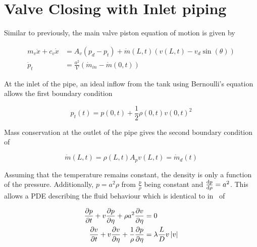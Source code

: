 \section{Valve Closing with Inlet piping}

Similar to previously, the main valve piston equation of motion is given by

\begin{equation*}
\begin{split}
    m_v \ddot{x} + c_v \dot{x} &= A_v \left( p_d - p_t \right) + \dot{m}(L,t) \left( v(L,t) - v_d \sin(\theta) \right) \\
    \dot{p}_t &= \frac{a^2}{V} \left( \dot{m}_{in} - \dot{m}(0,t) \right)
\end{split}
\end{equation*}

At the inlet of the pipe, an ideal inflow from the tank using Bernoulli's equation allows the first boundary condition

\begin{equation*}
    p_t(t) = p(0,t) + \frac{1}{2} \rho(0,t) v(0,t)^2
\end{equation*}

Mass conservation at the outlet of the pipe gives the second boundary condition of

\begin{equation*}
    \dot{m}(L,t) = \rho(L,t) A_p v(L,t) = \dot{m}_d(t)
\end{equation*}

Assuming that the temperature remains constant, the density is only a function of the pressure. Additionally, $p = a^2 \rho$ from $\frac{p}{\rho}$ being constant and $\frac{\mathrm{d}{p}}{\mathrm{d}{\rho}} = a^2$. This allows a PDE describing the fluid behaviour which is identical to in~\cite{Hos2015ModelPipe} of

\begin{equation*}
\begin{split}
    \frac{\partial{p}}{\partial{t}} + v \frac{\partial{p}}{\partial{\eta}} + \rho a^2 \frac{\partial{v}}{\partial{\eta}} &= 0 \\
    \frac{\partial{v}}{\partial{t}} + v \frac{\partial{v}}{\partial{\eta}} + \frac{1}{\rho} \frac{\partial{p}}{\partial{\eta}} &= \lambda \frac{L}{D} v \left| v \right|
\end{split}
\end{equation*}